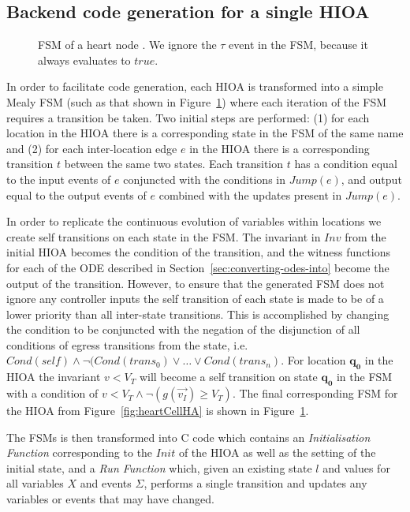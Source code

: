 \subsection{Backend code generation for a single \ac{HIOA}}
\label{sec:backendCodeGeneration}

\begin{figure}
  \centering
  
  \caption{\acf{FSM} of a heart node \label{fig:heartCellFSM}. We ignore
    the $\tau$ event in the \ac{FSM}, because it always evaluates to $true$.}
\end{figure}

In order to facilitate code generation, each \ac{HIOA} is transformed into a 
simple Mealy \ac{FSM} (such as that shown in Figure~\ref{fig:heartCellFSM}) 
where each iteration of the \ac{FSM} requires a transition be taken.  Two 
initial steps are performed: (1) for each location in the \ac{HIOA} there is a 
corresponding state in the \ac{FSM} of the same name and (2) for each 
inter-location edge $e$ in the \ac{HIOA} there is a corresponding transition $t$
between the same two states. Each transition $t$ has a condition equal to the 
input events of $e$ conjuncted with the conditions in $Jump(e)$, and output 
equal to the output events of $e$ combined with the updates present in 
$Jump(e)$.

In order to replicate the continuous evolution of variables within locations we 
create self transitions on each state in the \ac{FSM}. The invariant in $Inv$ 
from the initial \ac{HIOA} becomes the condition of the transition, and the 
witness functions for each of the \acs{ODE} described in 
Section~\ref{sec:converting-odes-into} become the output of the transition. 
However, to ensure that the generated \ac{FSM} does not ignore any controller 
inputs the self transition of each state is made to be of a lower priority 
than all inter-state transitions.  This is accomplished by changing the 
condition to be conjuncted with the negation of the disjunction of all 
conditions of egress transitions from the state, i.e. $Cond(self) \wedge \neg 
(Cond(trans_{0}) \vee \dots \vee Cond(trans_{n})$.  For location $\mathbf{q_0}$ 
in the \ac{HIOA} the invariant $v < V_{T}$ will become a self transition on 
state $\mathbf{q_0}$ in the \ac{FSM} with a condition of $v < V_{T} \wedge \neg 
(g(\vec{v_{I}}) \geq V_{T})$.  The final corresponding \ac{FSM} for the 
\ac{HIOA} from Figure~\ref{fig:heartCellHA} is shown in 
Figure~\ref{fig:heartCellFSM}.

The \acp{FSM} is then transformed into C code which contains an 
\emph{Initialisation Function} corresponding to the $Init$ of the \ac{HIOA} as 
well as the setting of the initial state, and a \emph{Run Function} which, 
given an existing state $l$ and values for all variables $X$ and events 
$\Sigma$, performs a single transition and updates any variables or events that 
may have changed.
